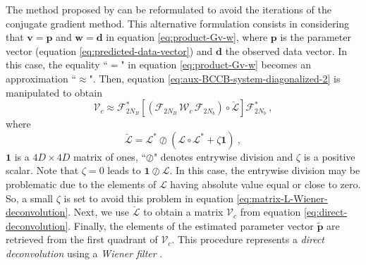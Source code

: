 The method proposed by \citet{takahashi-etal2020, takahashi-etal2022} can be reformulated to avoid the iterations 
of the conjugate gradient method.
This alternative formulation consists in considering that $\mathbf{v} = \mathbf{p}$ and 
$\mathbf{w} = \mathbf{d}$ in equation \ref{eq:product-Gv-w}, where $\mathbf{p}$ is the parameter vector (equation \ref{eq:predicted-data-vector})
and $\mathbf{d}$ the observed data vector.
In this case, the equality ``$=$" in equation \ref{eq:product-Gv-w} becomes an approximation ``$\approx$".
Then, equation \ref{eq:aux-BCCB-system-diagonalized-2} is manipulated to obtain
\begin{equation}
	\boldsymbol{\mathcal{V}}_{c} \approx 
	\boldsymbol{\mathcal{F}}_{2N_{B}}^{\ast} 
	\left[ \left( \boldsymbol{\mathcal{F}}_{2N_{B}} \, \boldsymbol{\mathcal{W}}_{c} \, \boldsymbol{\mathcal{F}}_{2N_{b}} \right)
	\circ \breve{\boldsymbol{\mathcal{L}}} \right] \boldsymbol{\mathcal{F}}_{2N_{b}}^{\ast} \: ,
	\label{eq:direct-deconvolution}
\end{equation}
where
\begin{equation}
	\breve{\boldsymbol{\mathcal{L}}} = 
	\boldsymbol{\mathcal{L}}^{\ast} \oslash \left( \boldsymbol{\mathcal{L}} \circ \boldsymbol{\mathcal{L}}^{\ast} + \zeta \mathbf{1} \right) \: ,
	\label{eq:matrix-L-Wiener-deconvolution}
\end{equation}
$\mathbf{1}$ is a $4D \times 4D$ matrix of ones, ``$\oslash$" denotes entrywise division and 
$\zeta$ is a positive scalar.
Note that $\zeta = 0$ leads to $\mathbf{1} \oslash \boldsymbol{\mathcal{L}}$.
In this case, the entrywise division may be problematic due to the elements of $\boldsymbol{\mathcal{L}}$ 
having absolute value equal or close to zero. So, a small $\zeta$ is set to avoid this problem
in equation \ref{eq:matrix-L-Wiener-deconvolution}.
Next, we use $\breve{\boldsymbol{\mathcal{L}}}$ to obtain a matrix $\boldsymbol{\mathcal{V}}_{c}$ from equation \ref{eq:direct-deconvolution}.
Finally, the elements of the estimated parameter vector $\tilde{\mathbf{p}}$ are retrieved from the first
quadrant of $\boldsymbol{\mathcal{V}}_{c}$.
This procedure represents a \textit{direct deconvolution} \citep[e.g.,][p. 220]{aster_etal2019}
using a \textit{Wiener filter} \citep[e.g.,][p. 263]{gonzalez-woods2002}.

